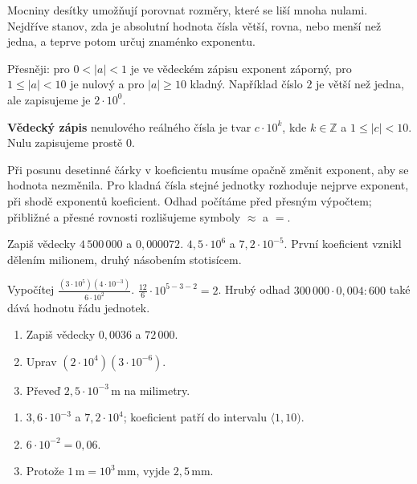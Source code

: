 \documentclass[11pt,a4paper]{article}
\begin{document}

Mocniny desítky umožňují porovnat rozměry, které se liší mnoha nulami. Nejdříve stanov, zda je absolutní hodnota čísla větší, rovna, nebo menší než jedna, a teprve potom určuj znaménko exponentu.

Přesněji: pro $0<|a|<1$ je ve vědeckém zápisu exponent záporný,
pro $1\le|a|<10$ je nulový a pro $|a|\ge10$ kladný.
Například číslo $2$ je větší než jedna, ale zapisujeme je $2\cdot10^0$.

\begin{definiceBox}[title={Definice},breakable=false]
\textbf{Vědecký zápis} nenulového reálného čísla je tvar $c\cdot10^k$, kde $k\in\mathbb Z$ a $1\le |c|<10$. Nulu zapisujeme prostě $0$.
\end{definiceBox}


Při posunu desetinné čárky v koeficientu musíme opačně změnit exponent, aby se hodnota nezměnila. Pro kladná čísla stejné jednotky rozhoduje nejprve exponent, při shodě exponentů koeficient. Odhad počítáme před přesným výpočtem; přibližné a přesné rovnosti rozlišujeme symboly $\approx$ a $=$.


\begin{prikladReseniBox}[title={Příklad 1},breakable=false]
Zapiš vědecky $4\,500\,000$ a $0{,}000072$.
\tcblower
$4{,}5\cdot10^6$ a $7{,}2\cdot10^{-5}$. První koeficient vznikl dělením milionem, druhý násobením stotisícem.
\end{prikladReseniBox}


\begin{prikladReseniBox}[title={Příklad 2},breakable=false]
Vypočítej $\frac{(3\cdot10^5)(4\cdot10^{-3})}{6\cdot10^2}$.
\tcblower
$\frac{12}{6}\cdot10^{5-3-2}=2$. Hrubý odhad $300\,000\cdot0{,}004:600$ také dává hodnotu řádu jednotek.
\end{prikladReseniBox}



\begin{zadaniReseniBox}[title={Procvičení},breakable=false]
\begin{enumerate}[label=\alph*)]
\item Zapiš vědecky $0{,}0036$ a $72\,000$.
\item Uprav $(2\cdot10^4)(3\cdot10^{-6})$.
\item Převeď $2{,}5\cdot10^{-3}\,\mathrm m$ na milimetry.
\end{enumerate}
\tcblower
\begin{enumerate}[label=\alph*)]
\item $3{,}6\cdot10^{-3}$ a $7{,}2\cdot10^4$; koeficient patří do intervalu $\langle1,10)$.
\item $6\cdot10^{-2}=0{,}06$.
\item Protože $1\,\mathrm m=10^3\,\mathrm{mm}$, vyjde $2{,}5\,\mathrm{mm}$.
\end{enumerate}
\end{zadaniReseniBox}
\end{document}
